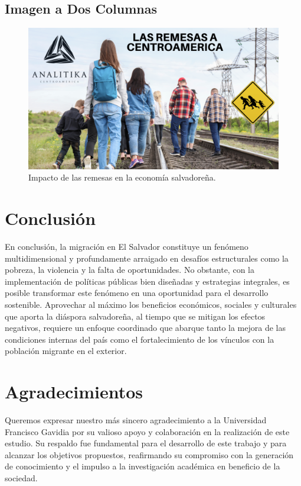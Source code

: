 \documentclass[conference]{IEEEtran}
\begin{document}
\subsection{Imagen a Dos Columnas}
\begin{figure}[t]
\centering
\includegraphics[width=\textwidth]{imagenes/impacto_remesas.png}
\caption{Impacto de las remesas en la economía salvadoreña.}
\label{fig:remesas}
\end{figure}

\section{Conclusión}
En conclusión, la migración en El Salvador constituye un fenómeno multidimensional y profundamente arraigado en desafíos estructurales como la pobreza, la violencia y la falta de oportunidades. No obstante, con la implementación de políticas públicas bien diseñadas y estrategias integrales, es posible transformar este fenómeno en una oportunidad para el desarrollo sostenible. Aprovechar al máximo los beneficios económicos, sociales y culturales que aporta la diáspora salvadoreña, al tiempo que se mitigan los efectos negativos, requiere un enfoque coordinado que abarque tanto la mejora de las condiciones internas del país como el fortalecimiento de los vínculos con la población migrante en el exterior.
\section*{Agradecimientos}
Queremos expresar nuestro más sincero agradecimiento a la Universidad Francisco Gavidia por su valioso apoyo y colaboración en la realización de este estudio. Su respaldo fue fundamental para el desarrollo de este trabajo y para alcanzar los objetivos propuestos, reafirmando su compromiso con la generación de conocimiento y el impulso a la investigación académica en beneficio de la sociedad.



\end{document}
